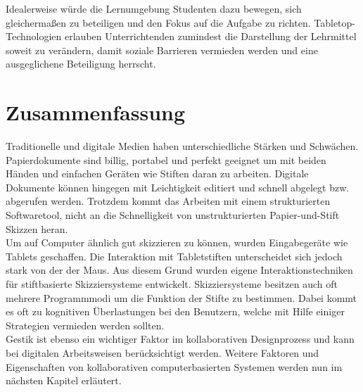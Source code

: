 \medskip Idealerweise würde die Lernumgebung Studenten dazu bewegen, sich gleichermaßen zu beteiligen und den Fokus auf die Aufgabe zu richten. Tabletop-Technologien erlauben Unterrichtenden zumindest die Darstellung der Lehrmittel soweit zu verändern, damit soziale Barrieren vermieden werden und eine ausgeglichene Beteiligung herrscht. \citep{Piper:2009}

\section*{Zusammenfassung}
Traditionelle und digitale Medien haben unterschiedliche Stärken und Schwächen. Papierdokumente sind billig, portabel und perfekt geeignet um mit beiden Händen und einfachen Geräten wie Stiften daran zu arbeiten. Digitale Dokumente können hingegen mit Leichtigkeit editiert und schnell abgelegt bzw. abgerufen werden. Trotzdem kommt das Arbeiten mit einem strukturierten Softwaretool, nicht an die Schnelligkeit von unstrukturierten Papier-und-Stift Skizzen heran. \\
Um auf Computer ähnlich gut skizzieren zu können, wurden Eingabegeräte wie Tablets geschaffen. Die Interaktion mit Tabletstiften unterscheidet sich jedoch stark von der der Maus. Aus diesem Grund wurden eigene Interaktionstechniken für stiftbasierte Skizziersysteme entwickelt. Skizziersysteme besitzen auch oft mehrere Programmmodi um die Funktion der Stifte zu bestimmen. Dabei kommt es oft zu kognitiven Überlastungen bei den Benutzern, welche mit Hilfe einiger Strategien vermieden werden sollten. \\
Gestik ist ebenso ein wichtiger Faktor im kollaborativen Designprozess und kann bei digitalen Arbeitsweisen berücksichtigt werden. Weitere Faktoren und Eigenschaften von kollaborativen computerbasierten Systemen werden nun im nächsten Kapitel erläutert.
